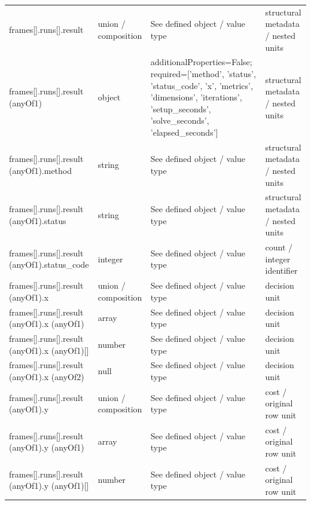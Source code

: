 \begin{longtable}{@{}>{\raggedright\arraybackslash}p{}>{\raggedright\arraybackslash}p{}>{\raggedright\arraybackslash}p{}>{\raggedright\arraybackslash}p{}@{}}
frames[].\allowbreak{}runs[].\allowbreak{}result & union /\allowbreak{} composition & See defined object /\allowbreak{} value type & structural metadata /\allowbreak{} nested units\\
frames[].\allowbreak{}runs[].\allowbreak{}result (anyOf1) & object & additionalProperties=\allowbreak{}False; required=\allowbreak{}['method', 'status', 'status\_\allowbreak{}code', 'x', 'metrics', 'dimensions', 'iterations', 'setup\_\allowbreak{}seconds', 'solve\_\allowbreak{}seconds', 'elapsed\_\allowbreak{}seconds'] & structural metadata /\allowbreak{} nested units\\
frames[].\allowbreak{}runs[].\allowbreak{}result (anyOf1).\allowbreak{}method & string & See defined object /\allowbreak{} value type & structural metadata /\allowbreak{} nested units\\
frames[].\allowbreak{}runs[].\allowbreak{}result (anyOf1).\allowbreak{}status & string & See defined object /\allowbreak{} value type & structural metadata /\allowbreak{} nested units\\
frames[].\allowbreak{}runs[].\allowbreak{}result (anyOf1).\allowbreak{}status\_\allowbreak{}code & integer & See defined object /\allowbreak{} value type & count /\allowbreak{} integer identifier\\
frames[].\allowbreak{}runs[].\allowbreak{}result (anyOf1).\allowbreak{}x & union /\allowbreak{} composition & See defined object /\allowbreak{} value type & decision unit\\
frames[].\allowbreak{}runs[].\allowbreak{}result (anyOf1).\allowbreak{}x (anyOf1) & array & See defined object /\allowbreak{} value type & decision unit\\
frames[].\allowbreak{}runs[].\allowbreak{}result (anyOf1).\allowbreak{}x (anyOf1)[] & number & See defined object /\allowbreak{} value type & decision unit\\
frames[].\allowbreak{}runs[].\allowbreak{}result (anyOf1).\allowbreak{}x (anyOf2) & null & See defined object /\allowbreak{} value type & decision unit\\
frames[].\allowbreak{}runs[].\allowbreak{}result (anyOf1).\allowbreak{}y & union /\allowbreak{} composition & See defined object /\allowbreak{} value type & cost /\allowbreak{} original row unit\\
frames[].\allowbreak{}runs[].\allowbreak{}result (anyOf1).\allowbreak{}y (anyOf1) & array & See defined object /\allowbreak{} value type & cost /\allowbreak{} original row unit\\
frames[].\allowbreak{}runs[].\allowbreak{}result (anyOf1).\allowbreak{}y (anyOf1)[] & number & See defined object /\allowbreak{} value type & cost /\allowbreak{} original row unit\\

\end{longtable}
